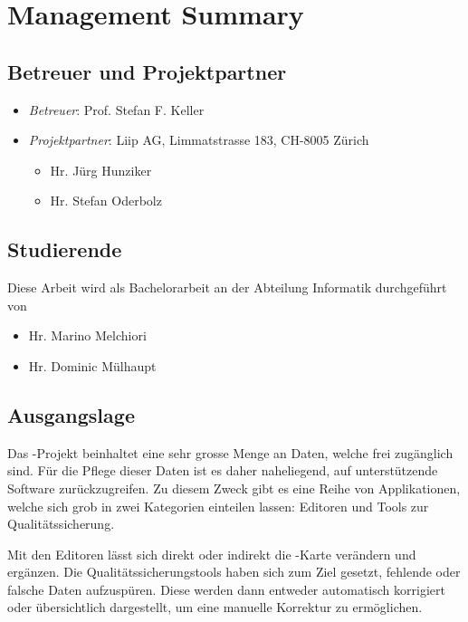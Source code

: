 \chapter*{Management Summary}
\thispagestyle{scrheadings}

\section*{Betreuer und Projektpartner}
\begin{itemize}
	\item \textit{Betreuer}: Prof. Stefan F. Keller
	\item \textit{Projektpartner}: Liip AG, Limmatstrasse 183, CH-8005 Zürich
	\begin{itemize}
		\item Hr. Jürg Hunziker
		\item Hr. Stefan Oderbolz
	\end{itemize}
\end{itemize}

\section*{Studierende}
Diese Arbeit wird als Bachelorarbeit an der Abteilung Informatik durchgeführt von
\begin{itemize}
	\item Hr. Marino Melchiori
	\item Hr. Dominic Mülhaupt
\end{itemize}

\section*{Ausgangslage}
Das -Projekt beinhaltet eine sehr grosse Menge an Daten, welche frei zugänglich sind.
Für die Pflege dieser Daten ist es daher naheliegend, auf unterstützende Software zurückzugreifen.
Zu diesem Zweck gibt es eine Reihe von Applikationen, welche sich grob in zwei Kategorien einteilen lassen:
Editoren und Tools zur Qualitätssicherung.

Mit den Editoren lässt sich direkt oder indirekt die -Karte verändern und ergänzen.
Die Qualitätssicherungstools haben sich zum Ziel gesetzt, fehlende oder falsche Daten aufzuspüren.
Diese werden dann entweder automatisch korrigiert oder übersichtlich dargestellt, um eine manuelle Korrektur zu ermöglichen.


